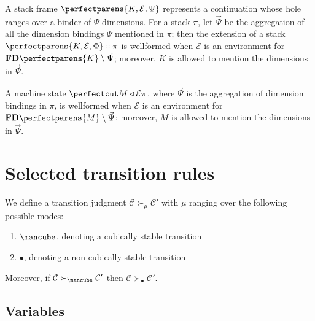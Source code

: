\documentclass{article}
\newcommand\Clo[2]{#1\triangleleft{#2}}
\newcommand\Cons[2]{{#1}\dblcolon{#2}}
\newcommand\FreeDims[1]{\mathbf{FD}\perfectparens{#1}}
\newcommand\Frame[3]{\perfectparens{#1,#2,#3}}
\newcommand\Cfg[3]{\cut{\Clo{#1}{#2}}{#3}}
\newcommand\Stable{\text{\mancube}}
\newcommand\NonStable{\bullet}
\newcommand\Step[3]{{#2}\mathrel{\succ_{#1}}{#3}}
\newcommand\Meta[1]{\mathbb{#1}}
\begin{document}
A stack frame $\Frame{K}{\mathcal{E}}{\Psi}$ represents a continuation
whose hole ranges over a binder of $\Psi$ dimensions. For a stack
$\pi$, let $\vec{\Psi}$ be the aggregation of all the dimension
bindings $\Psi$ mentioned in $\pi$; then the extension of a stack
$\Cons{\Frame{K}{\mathcal{E}}{\Phi}}{\pi}$ is wellformed when
$\mathcal{E}$ is an environment for $\FreeDims{K}\setminus\vec{\Psi}$;
moreover, $K$ is allowed to mention the dimensions in $\vec{\Psi}$.

A machine state $\Cfg{M}{\mathcal{E}}{\pi}$, where $\vec{\Psi}$ is the
aggregation of dimension bindings in $\pi$, is wellformed when
$\mathcal{E}$ is an environment for $\FreeDims{M}\setminus\vec{\Psi}$;
moreover, $M$ is allowed to mention the dimensions in $\vec{\Psi}$.

\section{Selected transition rules}

We define a transition judgment
$\Step{\mu}{\mathcal{C}}{\mathcal{C}'}$ with $\mu$ ranging over
the following possible modes:
\begin{enumerate}
\item $\Stable$, denoting a cubically stable transition
\item $\NonStable$, denoting a non-cubically stable transition
\end{enumerate}

Moreover, if $\Step{\Stable}{\mathcal{C}}{\mathcal{C}'}$ then
$\Step{\NonStable}{\mathcal{C}}{\mathcal{C}'}$.

\subsection{Variables}

\end{document}
